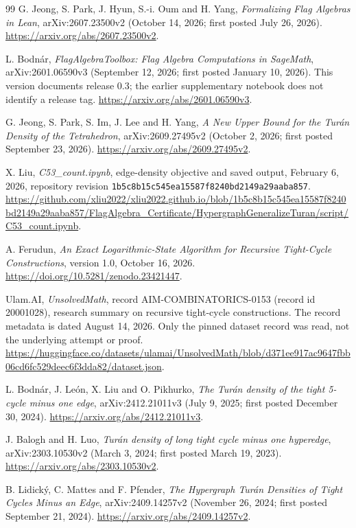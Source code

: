 \documentclass[11pt]{article}
\begin{document}
\begin{thebibliography}{99}
G. Jeong, S. Park, J. Hyun, S.-i. Oum and H. Yang,
\emph{Formalizing Flag Algebras in Lean},
arXiv:2607.23500v2 (October 14, 2026; first posted July 26, 2026).
\url{https://arxiv.org/abs/2607.23500v2}.

L. Bodn\'ar,
\emph{FlagAlgebraToolbox: Flag Algebra Computations in SageMath},
arXiv:2601.06590v3 (September 12, 2026; first posted January 10, 2026).
This version documents release 0.3; the earlier supplementary notebook
\cite{BLLPdata} does not identify a release tag.
\url{https://arxiv.org/abs/2601.06590v3}.

G. Jeong, S. Park, S. Im, J. Lee and H. Yang,
\emph{A New Upper Bound for the Tur\'an Density of the Tetrahedron},
arXiv:2609.27495v2 (October 2, 2026; first posted September 23, 2026).
\url{https://arxiv.org/abs/2609.27495v2}.

X. Liu,
\emph{C53\_count.ipynb}, edge-density objective and saved output,
February 6, 2026, repository revision
\texttt{1b5c8b15c545ea15587f8240bd2149a29aaba857}.
\url{https://github.com/xliu2022/xliu2022.github.io/blob/1b5c8b15c545ea15587f8240bd2149a29aaba857/FlagAlgebra_Certificate/HypergraphGeneralizeTuran/script/C53_count.ipynb}.

A. Ferudun,
\emph{An Exact Logarithmic-State Algorithm for Recursive Tight-Cycle Constructions},
version 1.0, October 16, 2026.
\url{https://doi.org/10.5281/zenodo.23421447}.

Ulam.AI, \emph{UnsolvedMath}, record AIM-COMBINATORICS-0153
(record id 20001028), research summary on recursive tight-cycle constructions.
The record metadata is dated August 14, 2026. Only the pinned dataset
record was read, not the underlying attempt or proof.
\url{https://huggingface.co/datasets/ulamai/UnsolvedMath/blob/d371ee917ac9647fbb06cd6fc529deec6f3dda82/dataset.json}.

L. Bodn\'ar, J. Le\'on, X. Liu and O. Pikhurko,
\emph{The Tur\'an density of the tight 5-cycle minus one edge},
arXiv:2412.21011v3 (July 9, 2025; first posted December 30, 2024).
\url{https://arxiv.org/abs/2412.21011v3}.

J. Balogh and H. Luo,
\emph{Tur\'an density of long tight cycle minus one hyperedge},
arXiv:2303.10530v2 (March 3, 2024; first posted March 19, 2023).
\url{https://arxiv.org/abs/2303.10530v2}.

B. Lidick\'y, C. Mattes and F. Pfender,
\emph{The Hypergraph Tur\'an Densities of Tight Cycles Minus an Edge},
arXiv:2409.14257v2 (November 26, 2024; first posted September 21, 2024).
\url{https://arxiv.org/abs/2409.14257v2}.


\end{thebibliography}
\end{document}
